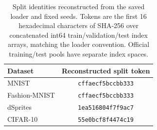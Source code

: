 \begin{table}[H]
\caption{Split identities reconstructed from the saved loader and fixed seeds. Tokens are the first 16 hexadecimal characters of SHA-256 over concatenated int64 train/validation/test index arrays, matching the loader convention. Official training/test pools have separate index spaces.}\label{tab:splits}
\small
\setlength{\tabcolsep}{3.5pt}
\begin{tabular*}{\textwidth}{@{\extracolsep{\fill}}lc@{}}
\toprule
Dataset & Reconstructed split token \\
\midrule
MNIST & \texttt{cffaecf5bccbb333} \\
Fashion-MNIST & \texttt{cffaecf5bccbb333} \\
dSprites & \texttt{1ea516804f7f9ac7} \\
CIFAR-10 & \texttt{55e0bcf8f4474c19} \\
\bottomrule
\end{tabular*}
\end{table}
